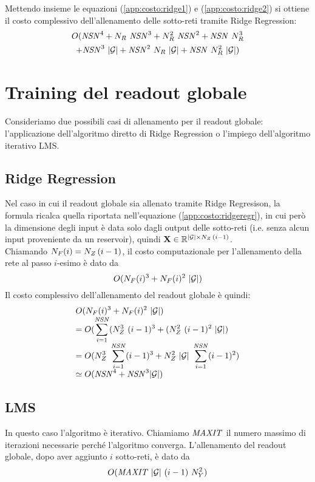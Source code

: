 Mettendo insieme le equazioni (\ref{app:costo:ridge1}) e (\ref{app:costo:ridge2}) si ottiene il costo complessivo dell'allenamento delle sotto-reti tramite Ridge Regression:
\begin{multline}
O(\mathit{NSN}^4 + N_R\ \mathit{NSN}^3 + N_R^2\ \mathit{NSN}^2 + \mathit{NSN}\ N_R^3 \\
+ \mathit{NSN}^3\ \lvert\mathcal{G}\rvert + \mathit{NSN}^2\ N_R\ \lvert\mathcal{G}\rvert + \mathit{NSN}\ N_R^2\ \lvert\mathcal{G}\rvert)
\end{multline}

\section{Training del readout globale}
Consideriamo due possibili casi di allenamento per il readout globale: l'applicazione dell'algoritmo diretto di Ridge Regression o l'impiego dell'algoritmo iterativo LMS.


\subsection{Ridge Regression}\label{app:costo:tr_globale_ridge}
Nel caso in cui il readout globale sia allenato tramite Ridge Regresison, la formula ricalca quella riportata nell'equazione (\ref{app:costo:ridgeregr}), in cui però la dimensione degli input è data solo dagli output delle sotto-reti (i.e. senza alcun input proveniente da un reservoir), quindi $\matr{X} \in \R^{\G \times \Nz\, (i-1)}$.\\
Chiamando $N_F(i) = N_Z\, (i-1)$, il costo computazionale per l'allenamento della rete al passo $i$-esimo è dato da
\begin{equation}
O(\Nf(i)^3 + \Nf(i)^2\ \G)
\end{equation}
Il costo complessivo dell'allenamento del readout globale è quindi:
\begin{equation}
\begin{array}{l}
\displaystyle O(\Nf(i)^3 + \Nf(i)^2\ \G) \\
\displaystyle = O(\sum_{i=1}^{\NSN} (\Nz^3\ (i-1)^3 + (\Nz^2\ (i-1)^2\ \G) \\
\displaystyle = O(\Nz^3\ \sum_{i=1}^{\NSN}(i-1)^3 + \Nz^2\ \G\ \sum_{i=1}^{\NSN}(i-1)^2) \\
\displaystyle \simeq O(\NSN^4 + \NSN^3 \G)\\
\end{array}
\end{equation}

\subsection{LMS}\label{app:costo:tr_globale_lms}
In questo caso l'algoritmo è iterativo. Chiamiamo $\mathit{MAXIT}$ il numero massimo di iterazioni necessarie perché l'algoritmo converga.
L'allenamento del readout globale, dopo aver aggiunto $i$ sotto-reti, è dato da
\begin{equation}
O(\MAXIT\ \G\ (i-1)\ \Ny^2)
\end{equation}

